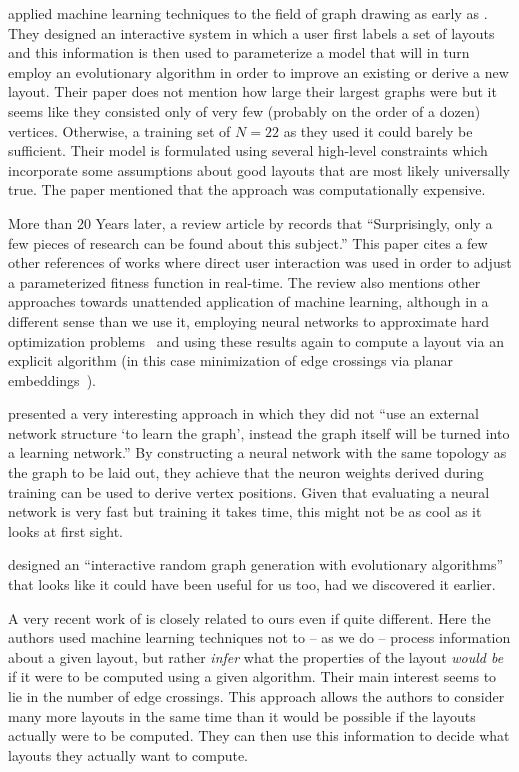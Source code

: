 \documentclass{graphstudy}
\begin{document}
\textcite{Masui1994} applied machine learning techniques to the field of graph drawing as early as \citeyear{Masui1994}.
They designed an interactive system in which a user first labels a set of layouts and this information is then used to
parameterize a model that will in turn employ an evolutionary algorithm in order to improve an existing or derive a new
layout.  Their paper does not mention how large their largest graphs were but it seems like they consisted only of very
few (probably on the order of a dozen) vertices.  Otherwise, a training set of \(N=22\) as they used it could barely be
sufficient.  Their model is formulated using several high-level constraints which incorporate some assumptions about
good layouts that are most likely universally true.  The paper mentioned that the approach was computationally
expensive.

More than 20 Years later, a \citeyear{Raissa2015} review article by \textcite{Raissa2015} records that
\enquote{Surprisingly, only a few pieces of research can be found about this subject.}  This paper cites a few other
references of works where direct user interaction was used in order to adjust a parameterized fitness function in
real-time.  The review also mentions other approaches towards unattended application of machine learning, although in a
different sense than we use it, employing neural networks to approximate hard optimization problems~\cite{Hopfield1985}
and using these results again to compute a layout via an explicit algorithm (in this case minimization of edge crossings
via planar embeddings~\cite{Cimikowski1996}).

\textcite{Meyer1998} presented a very interesting approach in which they did not \enquote{use an external network
  structure \enquote{to learn the graph}, instead the graph itself will be turned into a learning network.}  By
constructing a neural network with the same topology as the graph to be laid out, they achieve that the neuron weights
derived during training can be used to derive vertex positions.  Given that evaluating a neural network is very fast but
training it takes time, this might not be as cool as it looks at first sight.

\textcite{Bach2012} designed an \enquote{interactive random graph generation with evolutionary algorithms} that looks
like it could have been useful for us too, had we discovered it earlier.

A very recent work of \textcite{Kwon2018} is closely related to ours even if quite different.  Here the authors used
machine learning techniques not to -- as we do -- process information about a given layout, but rather \emph{infer} what
the properties of the layout \emph{would be} if it were to be computed using a given algorithm.  Their main interest
seems to lie in the number of edge crossings.  This approach allows the authors to consider many more layouts in the
same time than it would be possible if the layouts actually were to be computed.  They can then use this information to
decide what layouts they actually want to compute.
\end{document}
